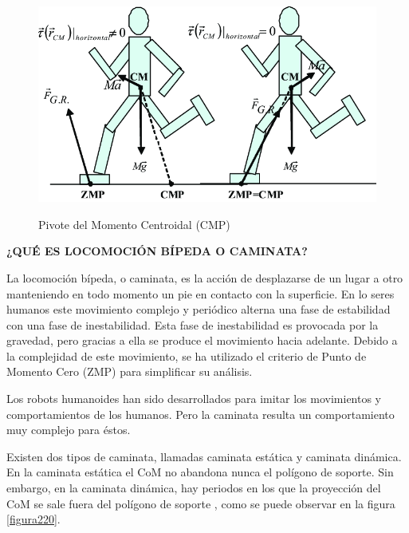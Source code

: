 \begin{itemize}
\begin{figure}[H]
\centering
{\includegraphics[scale=0.4]{imagenes/apartado_2/219_centroidal_moment_pivot}}
\caption{Pivote del Momento Centroidal (CMP)}
\label{figura219}
\end{figure}

\end{itemize}

\textbf{¿QUÉ ES LOCOMOCIÓN BÍPEDA O CAMINATA?}

La locomoción bípeda, o caminata, es la acción de desplazarse de un lugar a otro manteniendo en todo momento un pie en contacto con la superficie. En lo seres humanos este movimiento complejo y periódico alterna una fase de estabilidad con una fase de inestabilidad. Esta fase de inestabilidad es provocada por la gravedad, pero gracias a ella se produce el movimiento hacia adelante. Debido a la complejidad de este movimiento, se ha utilizado el criterio de Punto de Momento Cero (ZMP) para simplificar su análisis. 

Los robots humanoides han sido desarrollados para imitar los movimientos y comportamientos de los humanos. Pero la caminata resulta un comportamiento muy complejo para éstos. 

Existen dos tipos de caminata, llamadas caminata estática y  caminata dinámica. En la caminata estática el CoM no abandona nunca el polígono de soporte. Sin embargo, en la caminata dinámica, hay periodos en los que la proyección del CoM se sale fuera del polígono de soporte \cite{ref10}, como se puede observar en la figura \ref{figura220}.

